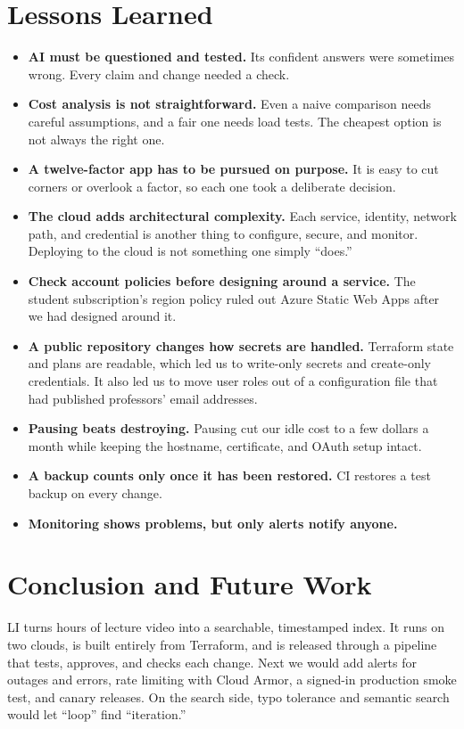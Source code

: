 \documentclass[conference]{IEEEtran}
\begin{document}
\section{Lessons Learned}
\label{sec:lessons}
\begin{itemize}
\item \textbf{AI must be questioned and tested.} Its confident answers
were sometimes wrong. Every claim and change needed a check.
\item \textbf{Cost analysis is not straightforward.} Even a naive
comparison needs careful assumptions, and a fair one needs load tests.
The cheapest option is not always the right one.
\item \textbf{A twelve-factor app has to be pursued on purpose.} It is easy
to cut corners or overlook a factor, so each one took a deliberate
decision.
\item \textbf{The cloud adds architectural complexity.} Each service,
identity, network path, and credential is another thing to configure,
secure, and monitor. Deploying to the cloud is not something one simply
``does.''
\item \textbf{Check account policies before designing around a service.}
The student subscription's region policy ruled out Azure Static Web Apps
after we had designed around it.
\item \textbf{A public repository changes how secrets are handled.}
Terraform state and plans are readable, which led us to write-only secrets
and create-only credentials. It also led us to move user roles out of a
configuration file that had published professors' email addresses.
\item \textbf{Pausing beats destroying.} Pausing cut our idle cost to a
few dollars a month while keeping the hostname, certificate, and OAuth
setup intact.
\item \textbf{A backup counts only once it has been restored.} CI restores
a test backup on every change.
\item \textbf{Monitoring shows problems, but only alerts notify anyone.}
\end{itemize}

\section{Conclusion and Future Work}
LI turns hours of lecture video into a searchable, timestamped index. It
runs on two clouds, is built entirely from Terraform, and is released
through a pipeline that tests, approves, and checks each change. Next we
would add alerts for outages and errors, rate limiting with Cloud Armor, a
signed-in production smoke test, and canary releases. On the search side,
typo tolerance and semantic search would let ``loop'' find ``iteration.''
\end{document}
